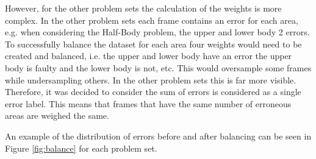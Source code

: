 However, for the other problem sets the calculation of the weights is more complex. In the other problem sets each frame contains an error for each area, e.g. when considering the Half-Body problem, the upper and lower body 2 errors. To successfully balance the dataset for each area four weights would need to be created and balanced, i.e. the upper and lower body have an error the upper body is faulty and the lower body is not, etc. This would oversample some frames while undersampling others. In the other problem sets this is far more visible. Therefore, it was decided to consider the sum of errors is considered as a single error label. This means that frames that have the same number of erroneous areas are weighed the same.

An example of the distribution of errors before and after balancing can be seen in Figure \ref{fig:balance} for each problem set.





